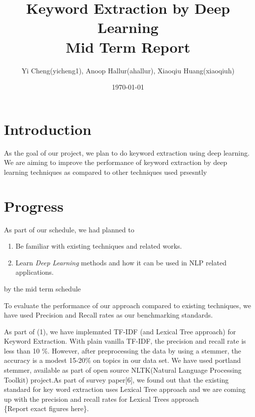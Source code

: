 \documentclass[dvips,12pt]{article}
\begin{document}
	
	
	\title{Keyword Extraction by Deep Learning \\Mid Term Report}
	\author{Yi Cheng(yicheng1), Anoop Hallur(ahallur), Xiaoqiu Huang(xiaoqiuh)}
	\date{\today}
	
	
	\maketitle
	
	
	\section{Introduction}
		As the goal of our project, we plan to do keyword extraction using deep learning. We are aiming to improve the performance of keyword extraction by deep learning techniques as compared to other techniques used prsesntly
	\section{Progress}
		As part of our schedule, we had planned to 
		\begin{enumerate}
		\item Be familiar with existing techniques and related works.
		\item Learn \emph{Deep Learning} methods and how it can be used in NLP related applications.
		\end{enumerate} 
		by the mid term schedule
		
		To evaluate the performance of our approach compared to existing techniques, we have used Precision and Recall rates as our benchmarking standards.
		  
		As part of (1), we have implemnted TF-IDF (and Lexical Tree approach) for Keyword Extraction. With plain vanilla TF-IDF, the precision and recall rate is less than 10 \%. However, after preprocessing the data by using a stemmer, the accuracy is a modest 15-20\% on topics in our data set.
		We have used portland stemmer, available as part of open source NLTK(Natural Language Processing Toolkit) project.As part of survey paper[6], we found out that the existing standard for key word extraction uses Lexical Tree approach and we are coming up with the precision and recall rates for Lexical Trees approach \\\{Report exact figures here\}.
		
\end{document}
